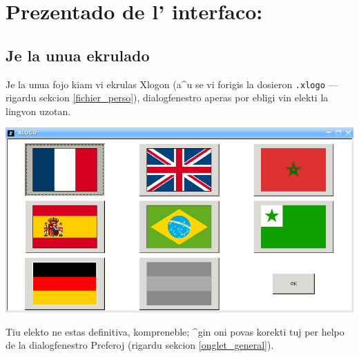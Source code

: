 \chapter{Prezentado de l' interfaco:}
\section{Je la unua ekrulado}
Je la unua fojo kiam vi ekrulas Xlogon (a^u se vi forigis la dosieron
\texttt{.xlogo} --- rigardu sekcion \ref{fichier_perso}),
dialogfenestro aperas por ebligi vin elekti la lingvon uzotan.
\begin{center}
\includegraphics[scale=0.2]{bildoj/CaptureLangue.png} 
\end{center}
Tiu elekto ne estas definitiva, kompreneble; ^gin oni povas korekti
tuj per helpo de la dialogfenestro Preferoj (rigardu sekcion
\ref{onglet_general}).
